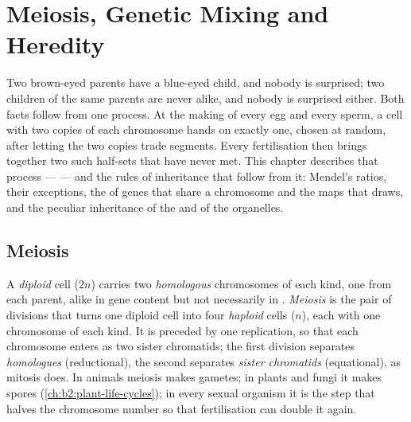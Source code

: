 \chapter{Meiosis, Genetic Mixing and Heredity}\label{ch:b2:meiosis-heredity}

Two brown-eyed parents have a blue-eyed child, and nobody is
surprised; two children of the same parents are never alike, and
nobody is surprised either. Both facts follow from one process. At
the making of every egg and every sperm, a cell with two copies of
each chromosome hands on exactly one, chosen at random, after
letting the two copies trade segments. Every fertilisation then
brings together two such half-sets that have never met. This
chapter describes that process ---  --- and the rules of
inheritance that follow from it: Mendel's ratios, their exceptions,
the  of genes that share a chromosome and the maps that
 draws, and the peculiar inheritance of the 
and of the organelles.

\section{Meiosis}

\begin{definition}[Meiosis]\label{def:b2:meiosis-heredity:meiosis}
A \emph{diploid} cell ($2n$) carries two \emph{homologous}
chromosomes of each kind, one from each parent, alike in gene
content but not necessarily in . \emph{Meiosis} is the pair
of divisions that turns one diploid cell into four \emph{haploid}
cells ($n$), each with one chromosome of each kind. It is preceded
by one replication, so that each chromosome enters as two sister
chromatids; the first division separates \emph{homologues}
(reductional), the second separates \emph{sister chromatids}
(equational), as mitosis does. In animals meiosis makes gametes; in
plants and fungi it makes spores (\cref{ch:b2:plant-life-cycles});
in every sexual organism it is the step that halves the chromosome
number so that fertilisation can double it again.
\end{definition}


